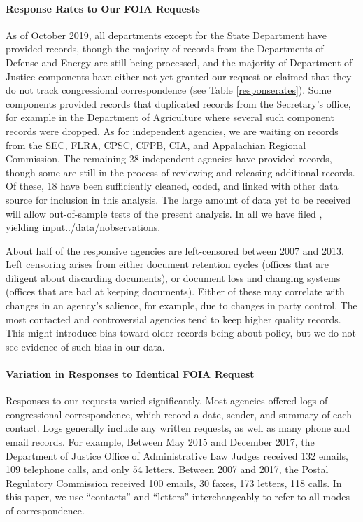 \paragraph{Response Rates to Our FOIA Requests}
As of October 2019, all departments except for the State Department have provided records, though the majority of records from the Departments of Defense and Energy are still being processed, and the majority of Department of Justice components have either not yet granted our request or claimed that they do not track congressional correspondence (see Table \ref{responserates}). 
Some components provided records that duplicated records from the Secretary's office, for example in the Department of Agriculture where several such component records were dropped. As for independent agencies, we are waiting on records from the SEC, FLRA, CPSC, CFPB, CIA, and Appalachian Regional Commission. 
The remaining 28 independent agencies have provided records, though some are still in the process of reviewing and releasing additional records. 
Of these, 18 have been sufficiently cleaned, coded, and linked with other data source for inclusion in this analysis. 
The large amount of data yet to be received will allow out-of-sample tests of the present analysis. In all we have filed \unskip, yielding input{../data/n}\unskip observations.

About half of the responsive agencies are left-censored between 2007 and 2013. 
Left censoring arises from either document retention cycles (offices that are diligent about discarding documents), or document loss and changing systems (offices that are bad at keeping documents). 
Either of these may correlate with changes in an agency's salience, for example, due to changes in party control.
The most contacted and controversial agencies tend to keep higher quality records.
This might introduce bias toward older records being about policy, but we do not see evidence of such bias in our data. 

 \paragraph{Variation in Responses to Identical FOIA Request} 
 Responses to our requests varied significantly. 
 Most agencies offered logs of congressional correspondence, which record a date, sender, and summary of each contact. Logs generally include any written requests, as well as many phone and email records. 
For example, Between May 2015 and December 2017, the Department of Justice Office of Administrative Law Judges received 132 emails, 109 telephone calls, and only 54 letters. 
Between 2007 and 2017, the Postal Regulatory Commission received 100 emails, 30 faxes, 173 letters, 118 calls. In this paper, we use ``contacts'' and ``letters'' interchangeably to refer to all modes of correspondence. \

